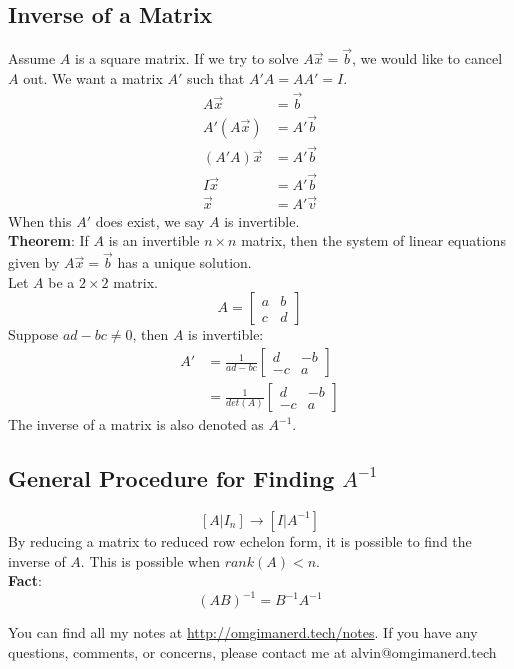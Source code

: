 \documentclass[letterpaper, 12pt]{math}
\begin{document}
\subsection*{Inverse of a Matrix}
Assume \( A \) is a square matrix. If we try to solve \( A\vec{x} = \vec{b} \),
we would like to cancel \( A \) out. We want a matrix \( A' \) such that
\( A'A = AA' = I \).
\begin{align*}
  A\vec{x} &= \vec{b} \\
  A'(A\vec{x}) &= A'\vec{b} \\
  (A'A)\vec{x} &= A'\vec{b} \\
  I\vec{x} &= A'\vec{b} \\
  \vec{x} &= A'\vec{v}
\end{align*}
When this \( A' \) does exist, we say \( A \) is invertible. \\
\textbf{Theorem}: If \( A \) is an invertible \( n\times n \) matrix, then the
system of linear equations given by \( A\vec{x} = \vec{b} \) has a unique
solution. \\
Let \( A \) be a \( 2\times2 \) matrix.
\[ A = \begin{bmatrix}a & b \\ c & d\end{bmatrix} \]
Suppose \( ad-bc \ne 0 \), then \( A \) is invertible:
\begin{align*}
  A' &= \frac{1}{ad-bc}\begin{bmatrix}d & -b \\ -c & a\end{bmatrix} \\
  &= \frac{1}{det(A)}\begin{bmatrix}d & -b \\ -c & a\end{bmatrix}
\end{align*}
The inverse of a matrix is also denoted as \( A^{-1} \).

\subsection*{General Procedure for Finding \( A^{-1} \)}
\[ [A|I_n] \rightarrow [I|A^{-1}] \]
By reducing a matrix to reduced row echelon form, it is possible to find the
inverse of \( A \). This is possible when \( rank(A) < n \). \\
\textbf{Fact}:
\[ (AB)^{-1} = B^{-1}A^{-1} \]

\begin{center}
  You can find all my notes at \url{http://omgimanerd.tech/notes}. If you have
  any questions, comments, or concerns, please contact me at
  alvin@omgimanerd.tech
\end{center}
\end{document}
